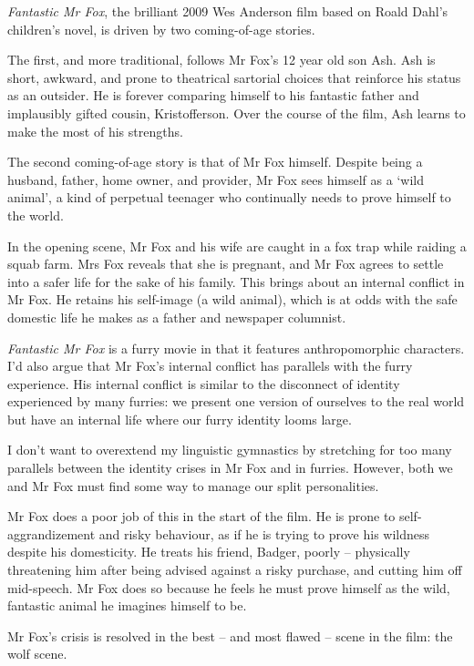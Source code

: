 
\textit{Fantastic Mr Fox}, the brilliant 2009 Wes Anderson film based on Roald Dahl's children's novel, is driven by two coming-of-age stories.

The first, and more traditional, follows Mr Fox's 12 year old son Ash. Ash is short, awkward, and prone to theatrical sartorial choices that reinforce his status as an outsider. He is forever comparing himself to his fantastic father and implausibly gifted cousin, Kristofferson. Over the course of the film, Ash learns to make the most of his strengths.

The second coming-of-age story is that of Mr Fox himself. Despite being a husband, father, home owner, and provider, Mr Fox sees himself as a ‘wild animal', a kind of perpetual teenager who continually needs to prove himself to the world.

In the opening scene, Mr Fox and his wife are caught in a fox trap while raiding a squab farm. Mrs Fox reveals that she is pregnant, and Mr Fox agrees to settle into a safer life for the sake of his family. This brings about an internal conflict in Mr Fox. He retains his self-image (a wild animal), which is at odds with the safe domestic life he makes as a father and newspaper columnist.

\textit{Fantastic Mr Fox} is a furry movie in that it features anthropomorphic characters. I'd also argue that Mr Fox's internal conflict has parallels with the furry experience. His internal conflict is similar to the disconnect of identity experienced by many furries: we present one version of ourselves to the real world but have an internal life where our furry identity looms large.

I don't want to overextend my linguistic gymnastics by stretching for too many parallels between the identity crises in Mr Fox and in furries. However, both we and Mr Fox must find some way to manage our split personalities.

Mr Fox does a poor job of this in the start of the film. He is prone to self-aggrandizement and risky behaviour, as if he is trying to prove his wildness despite his domesticity. He treats his friend, Badger, poorly – physically threatening him after being advised against a risky purchase, and cutting him off mid-speech. Mr Fox does so because he feels he must prove himself as the wild, fantastic animal he imagines himself to be.

Mr Fox's crisis is resolved in the best – and most flawed – scene in the film: the wolf scene.

